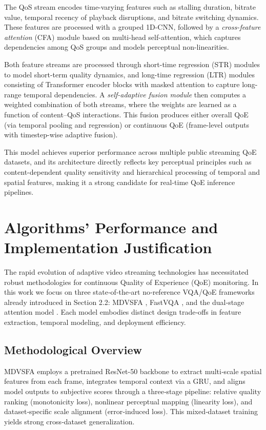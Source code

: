The QoS stream encodes time-varying features such as stalling duration, bitrate value, temporal recency of playback disruptions, and bitrate switching dynamics. These features are processed with a grouped 1D-CNN, followed by a \textit{cross-feature attention} (CFA) module based on multi-head self-attention, which captures dependencies among QoS groups and models perceptual non-linearities.

Both feature streams are processed through short-time regression (STR) modules to model short-term quality dynamics, and long-time regression (LTR) modules consisting of Transformer encoder blocks with masked attention to capture long-range temporal dependencies. A \textit{self-adaptive fusion module} then computes a weighted combination of both streams, where the weights are learned as a function of content–QoS interactions. This fusion produces either overall QoE (via temporal pooling and regression) or continuous QoE (frame-level outputs with timestep-wise adaptive fusion).

This model achieves superior performance across multiple public streaming QoE datasets, and its architecture directly reflects key perceptual principles such as content-dependent quality sensitivity and hierarchical processing of temporal and spatial features, making it a strong candidate for real-time QoE inference pipelines.

\section{Algorithms' Performance and Implementation Justification}  
\label{sec:performance_conclusions}

The rapid evolution of adaptive video streaming technologies has necessitated robust methodologies for continuous Quality of Experience (QoE) monitoring. In this work we focus on three state‐of‐the‐art no‐reference VQA/QoE frameworks already introduced in Section 2.2: MDVSFA \cite{li2023unified}, FastVQA \cite{wu2022fastvqa}, and the dual‐stage attention model \cite{jia2024continuous}. Each model embodies distinct design trade‐offs in feature extraction, temporal modeling, and deployment efficiency.

\subsection{Methodological Overview}  
MDVSFA \cite{li2023unified} employs a pretrained ResNet-50 backbone to extract multi‐scale spatial features from each frame, integrates temporal context via a GRU, and aligns model outputs to subjective scores through a three‐stage pipeline: relative quality ranking (monotonicity loss), nonlinear perceptual mapping (linearity loss), and dataset‐specific scale alignment (error‐induced loss). This mixed‐dataset training yields strong cross‐dataset generalization.  

